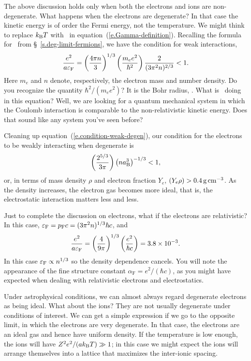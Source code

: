 The above discussion holds only when both the electrons and ions are non-degenerate.  What happens when the electrons are degenerate?  In that case the kinetic energy is of order the Fermi energy, not the temperature.  We might think to replace $k_\mathrm{B} T$ with \eF\ in equation~(\ref{e.Gamma-definition}). Recalling the formula for \eF\ from \S~\ref{s.deg-limit-fermions}, we have the condition for weak interactions,
\begin{equation}\label{e.condition-weak-degen}
\frac{e^{2}}{a \varepsilon_{\mathrm{F}}} = \left(\frac{4\pi n}{3}\right)^{1/3}\left(\frac{m_{e} e^{2}}{\hbar^{2}}\right)\frac{2}{(3\pi^{2} n)^{2/3}} < 1.
\end{equation}
Here $m_{e}$ and $n$ denote, respectively, the electron mass and number density.  Do you recognize the quantity $\hbar^{2}/(m_{e}e^{2})$?  It is the Bohr radius, \abohr.  What is \abohr\ doing in this equation?  Well, we are looking for a quantum mechanical system in which the Coulomb interaction is comparable to the non-relativistic kinetic energy.  Does that sound like any system you've seen before?

Cleaning up equation~(\ref{e.condition-weak-degen}), our condition for the electrons to be weakly interacting when degenerate is
\begin{equation}
\left(\frac{2^{5/3}}{3\pi}\right)\left( n a_{\mathrm{B}}^{3}\right)^{-1/3} < 1,
\end{equation}
or, in terms of mass density $\rho$ and electron fraction $Y_{e}$, $(Y_{e}\rho) > 0.4\,\mathrm{g}\,{\mathrm{c}\mathrm{m}}^{-3}$.  As the density increases, the electron gas becomes more ideal, that is, the electrostatic interaction matters less and less.  

Just to complete the discussion on electrons, what if the electrons are relativistic?  In this case, $\varepsilon_{\mathrm{F}} = p_{\mathrm{F}} c = (3\pi^{2}n)^{1/3}\hbar c$, and
\begin{equation}\label{e.condition-weak-rel-degen}
\frac{e^{2}}{a \varepsilon_{\mathrm{F}}} = \left(\frac{4}{9\pi}\right)^{1/3}\left(\frac{e^{2}}{\hbar c}\right) = 3.8\times 10^{-3}.
\end{equation}
In this case $\varepsilon_{\mathrm{F}} \propto n^{1/3}$ so the density dependence cancels.  You will note the appearance of the fine structure constant $\alpha_{\mathrm{F}} = e^{2}/(\hbar c)$, as you might have expected when dealing with relativistic electrons and electrostatics.

Under astrophysical conditions, we can almost always regard degenerate electrons as being ideal.  What about the ions?  They are not usually degenerate under conditions of interest. We can get a simple expression if we go to the opposite limit, in which the electrons are very degenerate.  In that case, the electrons are an ideal gas and hence have uniform density. If the temperature is low enough, the ions will have $Z^{2}e^{2}/(ak_\mathrm{B} T) \gg 1$; in this case we might expect the ions will arrange themselves into a lattice that maximizes the inter-ionic spacing.

